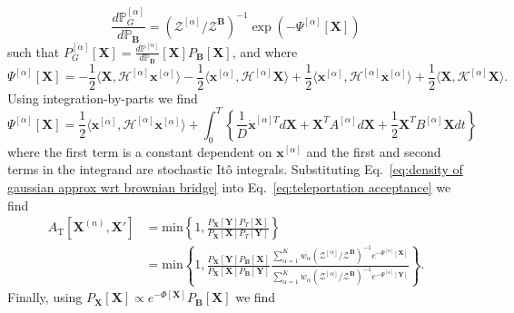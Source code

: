 \begin{equation}
	\frac{d \mathbb{P}_G^{[\alpha]}}{d \mathbb{P}_\mathbf{B} } = (\mathcal{Z}^{[\alpha]} / \mathcal{Z}^\mathbf{B} )^{-1} \exp \left(
		- \Psi^{[\alpha]}[\mathbf{X}]
	\right)
\end{equation}
such that $P_G^{[\alpha]}[\mathbf{X}] = \frac{d \mathbb{P}^{[\alpha]}}{d \mathbb{P}_\mathbf{B} }[\mathbf{X}] P_\mathbf{B}[\mathbf{X}]$, and where
\begin{equation} \label{eq:density of gaussian approx wrt brownian bridge}
	\Psi^{[\alpha]} [\mathbf{X}] =
		-\frac{1}{2} \langle \mathbf{X}, \mathcal{H}^{[\alpha]} \mathbf{x}^{[\alpha]} \rangle
		- \frac{1}{2} \langle \mathbf{x}^{[\alpha]}, \mathcal{H}^{[\alpha]} \mathbf{X} \rangle
		+ \frac{1}{2} \langle \mathbf{x}^{[\alpha]}, \mathcal{H}^{[\alpha]} \mathbf{x}^{[\alpha]} \rangle + \frac{1}{2} \langle \mathbf{X}, \mathcal{K}^{[\alpha]} \mathbf{X} \rangle.
\end{equation}
Using integration-by-parts we find
\begin{equation}
	\Psi^{[\alpha]} [\mathbf{X}] = \frac{1}{2} \langle \mathbf{x}^{[\alpha]}, \mathcal{H}^{[\alpha]} \mathbf{x}^{[\alpha]} \rangle + \int_0^T \left\{ \frac{1}{D} \dot{\mathbf{x}}^{[\alpha]T} d \mathbf{X} + \mathbf{X}^T A^{[\alpha]} d \mathbf{X} + \frac{1}{2} \mathbf{X}^T B^{[\alpha]} \mathbf{X} dt \right\} 
\end{equation}
where the first term is a constant dependent on $\mathbf{x}^{[\alpha]}$ and the first and second terms in the integrand are stochastic It\^{o} integrals. Substituting Eq.~\ref{eq:density of gaussian approx wrt brownian bridge} into Eq.~\ref{eq:teleportation acceptance} we find
\begin{equation}
\begin{aligned}
	A_\text{T}[\mathbf{X}^{(n)},\mathbf{X}'] & = \text{min} \left\{
		1,
		\frac{P_\mathbf{X}[\mathbf{Y}] P_T[\mathbf{X}] }{ P_\mathbf{X}[\mathbf{X}] P_T[\mathbf{Y}] } 
	\right\} \\
	& = \text{min} \left\{
		1,
		\frac{P_\mathbf{X}[\mathbf{Y}] P_\mathbf{B}[\mathbf{X}] }{ P_\mathbf{X}[\mathbf{X}] P_\mathbf{B}[\mathbf{Y}] }
		\frac{\sum_{\alpha=1}^K w_\alpha (\mathcal{Z}^{[\alpha]}/\mathcal{Z}^\mathbf{B})^{-1} e^{ - \Psi^{[\alpha]}[\mathbf{X}] } }{ \sum_{\alpha=1}^K w_\alpha (\mathcal{Z}^{[\alpha]}/\mathcal{Z}^\mathbf{B})^{-1} e^{ - \Psi^{[\alpha]}[\mathbf{Y}] } }
	\right\}.
\end{aligned}
\end{equation}
Finally, using $P_\mathbf{X}[\mathbf{X}] \propto e^{- \Phi[\mathbf{X}] } P_\mathbf{B}[\mathbf{X}]$ we find

